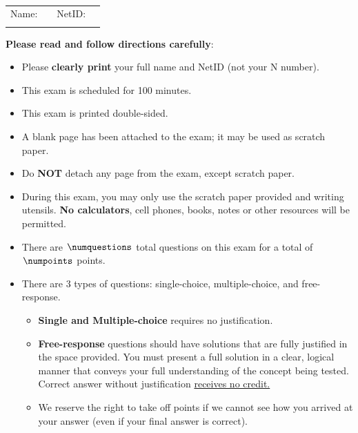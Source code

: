 \documentclass[10pt, addpoints]{exam}
\theoremstyle{definition}
\begin{document}
\addpoints

\extrawidth{.25in}
\usehorizontalhalf
\setlength\topmargin{-.75in}


\begin{titlepage}
\\


\noindent \begin{center}\begin{tabular}{|cccc|}\hline
\large Name: & \hspace{4in} 
&
\large NetID: & \hspace{1in} \\
&&&\\
 \hline
 \end{tabular}\end{center}
\vspace{.3in}
\noindent\textbf{Please read and follow directions carefully}: 

\begin{itemize}
	\setlength\itemsep{0em}
	\item Please \textbf{clearly print} your full name and NetID (not your N number).
	\item This exam is scheduled for 100 minutes.
\item This exam is printed double-sided.
\item A blank page has been attached to the exam; it may be used as scratch paper.
\item Do \textbf{NOT} detach any page from the exam, except scratch paper.
\item During this exam, you may only use the scratch paper provided and writing utensils. \textbf{No calculators}, cell phones, books, notes or other resources will be permitted.
	\item There are $\numquestions$ total questions on this exam for a total of $\numpoints$ points.
	\item There are 3 types of questions: single-choice, multiple-choice, and free-response. 
	\begin{itemize}
	\item \textbf{Single and Multiple-choice} requires no justification. 
	\item \textbf{Free-response} questions should have solutions that are fully justified in the space provided.
	You must present a full solution in a clear, logical manner that conveys your full understanding of the concept being tested. Correct answer without justification \underline{receives no credit.}
	\item We reserve the right to take off points if we cannot see how you arrived at your answer (even if your final answer is correct).
	\end{itemize}


\end{itemize}
\end{titlepage}
\end{document}
